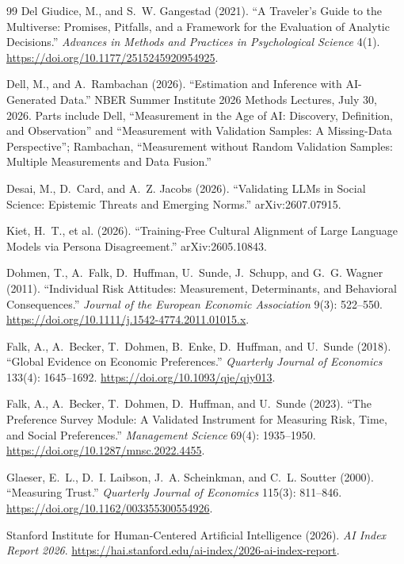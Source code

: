 \documentclass[10pt,letterpaper]{article}
\begin{document}
\begin{thebibliography}{99}
 Del Giudice, M., and S.~W. Gangestad (2021). ``A Traveler's Guide to the Multiverse: Promises, Pitfalls, and a Framework for the Evaluation of Analytic Decisions.'' \textit{Advances in Methods and Practices in Psychological Science} 4(1). \url{https://doi.org/10.1177/2515245920954925}.

 Dell, M., and A.~Rambachan (2026). ``Estimation and Inference with AI-Generated Data.'' NBER Summer Institute 2026 Methods Lectures, July 30, 2026. Parts include Dell, ``Measurement in the Age of AI: Discovery, Definition, and Observation'' and ``Measurement with Validation Samples: A Missing-Data Perspective''; Rambachan, ``Measurement without Random Validation Samples: Multiple Measurements and Data Fusion.''

 Desai, M., D.~Card, and A.~Z. Jacobs (2026). ``Validating LLMs in Social Science: Epistemic Threats and Emerging Norms.'' arXiv:2607.07915.

 Kiet, H.~T., et al. (2026). ``Training-Free Cultural Alignment of Large Language Models via Persona Disagreement.'' arXiv:2605.10843.

 Dohmen, T., A.~Falk, D.~Huffman, U.~Sunde, J.~Schupp, and G.~G. Wagner (2011). ``Individual Risk Attitudes: Measurement, Determinants, and Behavioral Consequences.'' \textit{Journal of the European Economic Association} 9(3): 522--550. \url{https://doi.org/10.1111/j.1542-4774.2011.01015.x}.

 Falk, A., A.~Becker, T.~Dohmen, B.~Enke, D.~Huffman, and U.~Sunde (2018). ``Global Evidence on Economic Preferences.'' \textit{Quarterly Journal of Economics} 133(4): 1645--1692. \url{https://doi.org/10.1093/qje/qjy013}.

 Falk, A., A.~Becker, T.~Dohmen, D.~Huffman, and U.~Sunde (2023). ``The Preference Survey Module: A Validated Instrument for Measuring Risk, Time, and Social Preferences.'' \textit{Management Science} 69(4): 1935--1950. \url{https://doi.org/10.1287/mnsc.2022.4455}.

 Glaeser, E.~L., D.~I. Laibson, J.~A. Scheinkman, and C.~L. Soutter (2000). ``Measuring Trust.'' \textit{Quarterly Journal of Economics} 115(3): 811--846. \url{https://doi.org/10.1162/003355300554926}.

 Stanford Institute for Human-Centered Artificial Intelligence (2026). \textit{AI Index Report 2026}. \url{https://hai.stanford.edu/ai-index/2026-ai-index-report}.


\end{thebibliography}
\end{document}
